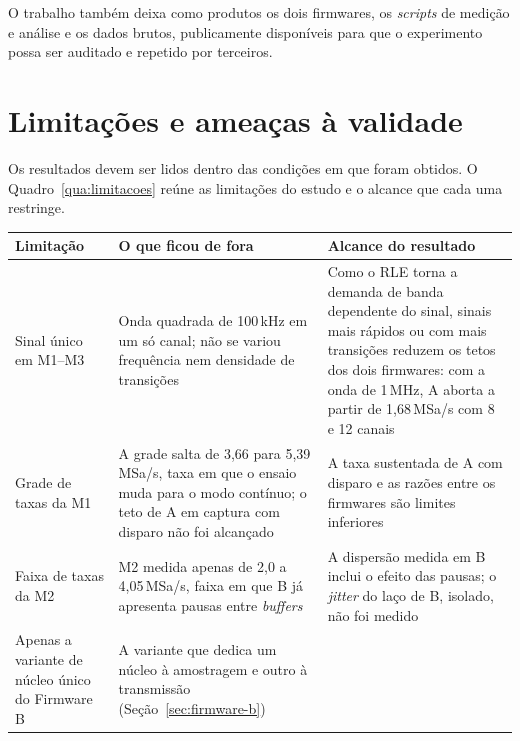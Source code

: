 O trabalho também deixa como produtos os dois firmwares, os \emph{scripts} de
medição e análise e os dados brutos, publicamente disponíveis
\cite{dias2026artefatos} para que o experimento possa ser auditado e repetido
por terceiros.

\section{Limitações e ameaças à validade}\label{sec:limitacoes}

Os resultados devem ser lidos dentro das condições em que foram obtidos. O
Quadro~\ref{qua:limitacoes} reúne as limitações do estudo e o alcance que cada
uma restringe.

\begin{quadro}[H]
  \centering
  \caption{Limitações do estudo.}
  \label{qua:limitacoes}
  \small
  \begin{tabularx}{\linewidth}{|>{\raggedright\arraybackslash}p{3.0cm}|>{\raggedright\arraybackslash}X|>{\raggedright\arraybackslash}X|}
    \hline
    \textbf{Limitação} & \textbf{O que ficou de fora}                                                                                                                                                                                                           & \textbf{Alcance do resultado} \\ \hline
    Sinal único em M1--M3
                       & Onda quadrada de 100\,kHz em um só canal; não se variou frequência nem densidade de transições
                       & Como o \ac{RLE} torna a demanda de banda dependente do sinal, sinais mais rápidos ou com mais transições reduzem os tetos dos dois firmwares: com a onda de 1\,MHz, A aborta a partir de 1,68\,MSa/s com 8 e 12 canais \\ \hline
    Grade de taxas da M1
                       & A grade salta de 3,66 para 5,39\,MSa/s, taxa em que o ensaio muda para o modo contínuo; o teto de A em captura com disparo não foi alcançado
                       & A taxa sustentada de A com disparo e as razões entre os firmwares são limites inferiores \\ \hline
    Faixa de taxas da M2
                       & M2 medida apenas de 2,0 a 4,05\,MSa/s, faixa em que B já apresenta pausas entre \emph{buffers}
                       & A dispersão medida em B inclui o efeito das pausas; o \emph{jitter} do laço de B, isolado, não foi medido \\ \hline
    Apenas a variante de núcleo único do Firmware B
                       & A variante que dedica um núcleo à amostragem e outro à transmissão (Seção~\ref{sec:firmware-b})

\end{tabularx}
\end{quadro}
